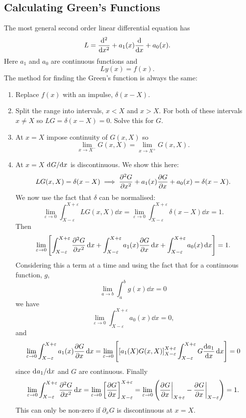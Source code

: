 \documentclass[a4paper]{article}
\begin{document}
    \subsection{Calculating Green's Functions}
    The most general second order linear differential equation has
    \[L = \dv[2]{x} + a_1(x)\dv{x} + a_0(x).\]
    Here \(a_1\) and \(a_0\) are continuous functions and
    \[Ly(x) = f(x).\]
    The method for finding the Green's function is always the same:
    \begin{enumerate}
        \item Replace \(f(x)\) with an impulse, \(\delta(x - X)\).
        \item Split the range into intervals, \(x < X\) and \(x > X\).
        For both of these intervals \(x \ne X\) so \(LG = \delta(x - X) = 0\).
        Solve this for \(G\).
        \item At \(x = X\) impose continuity of \(G(x, X)\) so
        \[\lim_{x\to X^-} G(x, X) = \lim_{x\to X^+}G(x, X).\]
        \item At \(x = X\) \(\mathrm{d}^{}{G}/\mathrm{d}{x}^{}\) is discontinuous.
        We show this here:
        \[LG(x, X) = \delta(x - X) \implies \pdv[2]{G}{x} + a_1(x)\pdv{G}{x} + a_0(x) = \delta(x - X).\]
        We now use the fact that \(\delta\) can be normalised:
        \[\lim_{\varepsilon\to 0}\int_{X - \varepsilon}^{X + \varepsilon} LG(x, X)\dd{x} = \lim_{\varepsilon\to 0}\int_{X - \varepsilon}^{X + \varepsilon} \delta(x - X) \dd{x} = 1.\]
        Then
        \[\lim_{\varepsilon\to 0}\left[\int_{X - \varepsilon}^{X + \varepsilon} \pdv[2]{G}{x} \dd{x} + \int_{X - \varepsilon}^{X + \varepsilon} a_1(x)\pdv{G}{x}\dd{x} + \int_{X - \varepsilon}^{X + \varepsilon}a_0(x)\dd{x}\right] = 1.\]
        Considering this a term at a time and using the fact that for a continuous function, \(g\),
        \[\lim_{a\to b}\int_a^b g(x)\dd{x} = 0\]
        we have
        \[\lim_{\varepsilon\to 0} \int_{X - \varepsilon}^{X + \varepsilon}a_0(x)\dd{x} = 0,\]
        and
        \[\lim_{\varepsilon\to 0} \int_{X - \varepsilon}^{X + \varepsilon} a_1(x)\pdv{G}{x}\dd{x} = \lim_{\varepsilon\to 0}\left[ \left[a_1(X)G(x, X)\right]_{X - \varepsilon}^{X + \varepsilon} \int_{X - \varepsilon}^{X + \varepsilon} G\dv{a_1}{x} \dd{x} \right] = 0\]
        since \(\mathrm{d}^{}{a_1}/\mathrm{d}{x}^{}\) and \(G\) are continuous.
        Finally
        \[\lim_{\varepsilon\to 0} \int_{X - \varepsilon}^{X + \varepsilon} \pdv[2]{G}{x}\dd{x} = \lim_{\varepsilon\to 0} \left[\pdv{G}{x}\right]_{X - \varepsilon}^{X + \varepsilon} = \lim_{\varepsilon\to 0}\left(\pdv[]{G}{x}\biggr|_{X + \varepsilon} - \pdv[]{G}{x}\biggr|_{X - \varepsilon}\right) = 1.\]
        This can only be non-zero if \(\partial_x G\) is discontinuous at \(x = X\).
    \end{enumerate}
\end{document}
